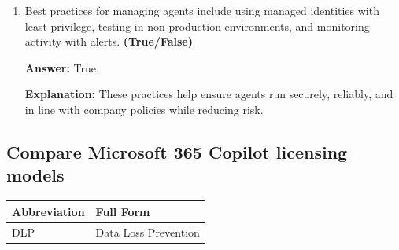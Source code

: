 \documentclass[10pt]{article}
\begin{document}
\begin{enumerate}[leftmargin=*]
\textbf{Explanation:} Agents are designed for repeatable, multi-step processes that integrate with enterprise systems and can run on schedules.

\item Best practices for managing agents include using managed identities with least privilege, testing in non-production environments, and monitoring activity with alerts. \textbf{(True/False)}

\textbf{Answer:} True.

\textbf{Explanation:} These practices help ensure agents run securely, reliably, and in line with company policies while reducing risk.

\end{enumerate}
\clearpage

\subsection{Compare Microsoft 365 Copilot licensing models}

\begin{center}
\begin{tabular}{>{\raggedright\arraybackslash}p{} >{\raggedright\arraybackslash}p{}}
\toprule
\textbf{Abbreviation} & \textbf{Full Form} \\
\midrule
DLP & Data Loss Prevention \\
\end{tabular}
\end{center}
\end{document}
